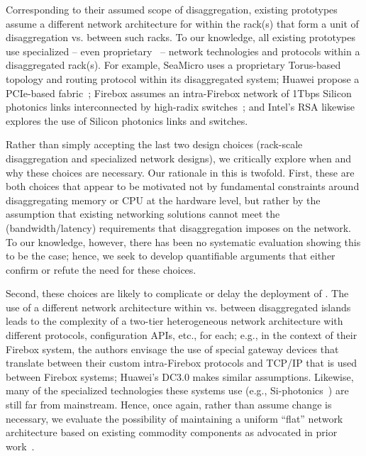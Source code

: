 Corresponding to their assumed scope of disaggregation, existing prototypes assume a different network architecture for within the rack(s) that form a unit of disaggregation vs. between such racks. To our knowledge, all existing \dis prototypes use specialized -- even proprietary~\cite{seamicro,huawei,rsa} -- network technologies and protocols within a disaggregated rack(s). For example, SeaMicro uses a proprietary Torus-based topology and routing protocol within its disaggregated system; Huawei propose a PCIe-based fabric~\cite{huawei1}; Firebox assumes an intra-Firebox network of 1Tbps Silicon photonics links interconnected by high-radix switches~\cite{firebox,vladimir}; and Intel's RSA likewise explores the use of Silicon photonics links and switches. 

Rather than simply accepting the last two design choices (rack-scale disaggregation and specialized network designs), we critically explore when and why these choices are necessary. Our rationale in this is twofold. 
First, these are both choices that appear to be motivated not by fundamental constraints around disaggregating memory or CPU at the hardware level, but rather by the assumption that existing networking solutions cannot meet the (bandwidth/latency) requirements that disaggregation imposes on the network. To our knowledge, however, there has been no systematic evaluation showing this to be the case; hence, we seek to develop quantifiable arguments that either confirm or refute the need for these choices. 

Second, these choices are likely to complicate or delay the deployment of \dis. The use of a different network architecture within vs. between disaggregated islands leads to the complexity of a two-tier heterogeneous network architecture with different protocols, configuration APIs, etc., for each; e.g., in the context of their Firebox system, the authors envisage the use of special gateway devices that translate between their custom intra-Firebox protocols and TCP/IP that is used between Firebox systems; Huawei's DC3.0 makes similar assumptions. Likewise, many of the specialized technologies these systems use (e.g., Si-photonics~\cite{vladimir-nature}) are still far from mainstream. 
Hence, once again, rather than assume change is necessary, we evaluate the possibility of maintaining a uniform ``flat'' network architecture based on existing commodity components as advocated in prior work~\cite{el-fares,vl2,greenberg-costs}. 
%



